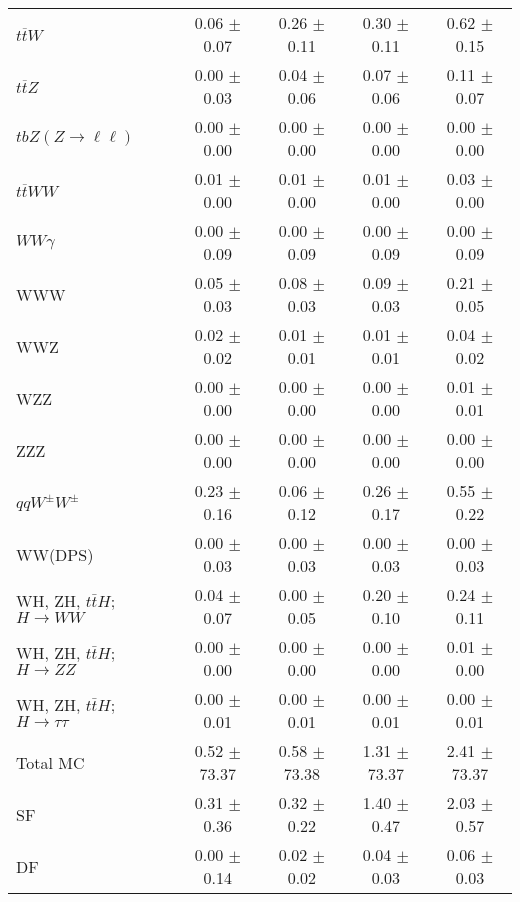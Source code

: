 \begin{tabular}{l|cccc}
                   $t\overline{t}W$ &  0.06 $\pm$  0.07 &  0.26 $\pm$  0.11 &  0.30 $\pm$  0.11 &  0.62 $\pm$  0.15 \\
                   $t\overline{t}Z$ &  0.00 $\pm$  0.03 &  0.04 $\pm$  0.06 &  0.07 $\pm$  0.06 &  0.11 $\pm$  0.07 \\
    $tbZ (Z \rightarrow \ell \ell)$ &  0.00 $\pm$  0.00 &  0.00 $\pm$  0.00 &  0.00 $\pm$  0.00 &  0.00 $\pm$  0.00 \\
                  $t\overline{t}WW$ &  0.01 $\pm$  0.00 &  0.01 $\pm$  0.00 &  0.01 $\pm$  0.00 &  0.03 $\pm$  0.00 \\
                         $WW\gamma$ &  0.00 $\pm$  0.09 &  0.00 $\pm$  0.09 &  0.00 $\pm$  0.09 &  0.00 $\pm$  0.09 \\
                                WWW &  0.05 $\pm$  0.03 &  0.08 $\pm$  0.03 &  0.09 $\pm$  0.03 &  0.21 $\pm$  0.05 \\
                                WWZ &  0.02 $\pm$  0.02 &  0.01 $\pm$  0.01 &  0.01 $\pm$  0.01 &  0.04 $\pm$  0.02 \\
                                WZZ &  0.00 $\pm$  0.00 &  0.00 $\pm$  0.00 &  0.00 $\pm$  0.00 &  0.01 $\pm$  0.01 \\
                                ZZZ &  0.00 $\pm$  0.00 &  0.00 $\pm$  0.00 &  0.00 $\pm$  0.00 &  0.00 $\pm$  0.00 \\
                 $qqW^{\pm}W^{\pm}$ &  0.23 $\pm$  0.16 &  0.06 $\pm$  0.12 &  0.26 $\pm$  0.17 &  0.55 $\pm$  0.22 \\
                            WW(DPS) &  0.00 $\pm$  0.03 &  0.00 $\pm$  0.03 &  0.00 $\pm$  0.03 &  0.00 $\pm$  0.03 \\
WH, ZH, $t\bar{t}H$; $H \rightarrow WW$ &  0.04 $\pm$  0.07 &  0.00 $\pm$  0.05 &  0.20 $\pm$  0.10 &  0.24 $\pm$  0.11 \\
WH, ZH, $t\bar{t}H$; $H \rightarrow ZZ$ &  0.00 $\pm$  0.00 &  0.00 $\pm$  0.00 &  0.00 $\pm$  0.00 &  0.01 $\pm$  0.00 \\
WH, ZH, $t\bar{t}H$; $H \rightarrow \tau\tau$ &  0.00 $\pm$  0.01 &  0.00 $\pm$  0.01 &  0.00 $\pm$  0.01 &  0.00 $\pm$  0.01 \\
\hline\hline
                           Total MC &  0.52 $\pm$ 73.37 &  0.58 $\pm$ 73.38 &  1.31 $\pm$ 73.37 &  2.41 $\pm$ 73.37 \\
\hline
                                 SF &  0.31 $\pm$  0.36 &  0.32 $\pm$  0.22 &  1.40 $\pm$  0.47 &  2.03 $\pm$  0.57 \\
                                 DF &  0.00 $\pm$  0.14 &  0.02 $\pm$  0.02 &  0.04 $\pm$  0.03 &  0.06 $\pm$  0.03 \\

\end{tabular}
